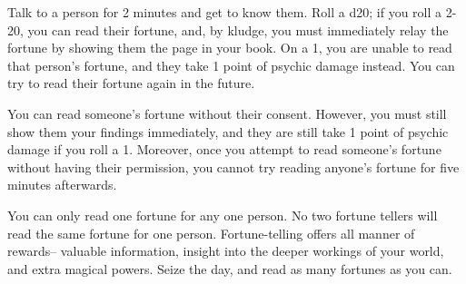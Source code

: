 \documentclass[green]{Kos}
\begin{document}
\name{\gFortuneTelling{}}


Talk to a person for 2 minutes and get to know them. Roll a d20; if you roll a 2-20, you can read their fortune, and, by kludge, you must immediately relay the fortune by showing them the page in your book. On a 1, you are unable to read that person’s fortune, and they take 1 point of psychic damage instead. You can try to read their fortune again in the future.

You can read someone’s fortune without their consent. However, you must still show them your findings immediately, and they are still take 1 point of psychic damage if you roll a 1. Moreover, once you attempt to read someone’s fortune without having their permission, you cannot try reading anyone’s fortune for five minutes afterwards. 

You can only read one fortune for any one person. No two fortune tellers will read the same fortune for one person. Fortune-telling offers all manner of rewards-- valuable information, insight into the deeper workings of your world, and extra magical powers.  Seize the day, and read as many fortunes as you can.
\end{document}
